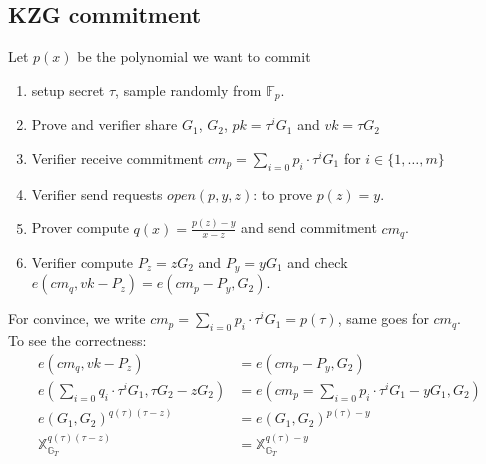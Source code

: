 \documentclass[10pt]{article}
\newcommand{\FField}{\mathbb{F}_p}
\begin{document}
\subsection{KZG commitment}
Let $p(x)$ be the polynomial we want to commit
\begin{enumerate}
    \item setup secret $\tau$, sample randomly from $\FField$.
    \item Prove and verifier share $G_1$, $G_2$, $pk = \tau^iG_1$ and $vk = \tau G_2$
    \item Verifier receive commitment ${cm}_p = \sum_{i=0}p_i \cdot \tau^iG_1$ for
        $i \in \{1, \ldots, m\}$
    \item Verifier send requests $open(p, y, z)$: to prove $p(z) = y$.
    \item Prover compute $q(x) = \frac{p(z) - y}{x-z}$ and send commitment
        ${cm}_q$.
    \item Verifier compute $P_z = zG_2$ and $P_y = yG_1$ and check 
        $e({cm}_q, vk-P_z) = e({cm}_p-P_y, G_2)$.
\end{enumerate}
For convince, we write $cm_{p} = \sum_{i=0}p_i \cdot \tau^iG_1 = p(\tau)$, same
goes for ${cm}_q$.\\
To see the correctness:
\[
\begin{aligned}
    e({cm}_q, vk-P_z) &= e({cm}_p-P_y, G_2)\\
    e(\sum_{i=0}q_i \cdot \tau^iG_1, \tau G_2-z G_2) &= e({cm}_p =
    \sum_{i=0}p_i \cdot \tau^iG_1-yG_1, G_2)\\
    e(G_1, G_2)^{q(\tau)(\tau - z)} &= e(G_1,G_2)^{p(\tau)-y}\\
    \mathbb{X}^{q(\tau)(\tau - z)}_{\mathbb{G}_T} &= \mathbb{X}^{q(\tau) - y}_{\mathbb{G}_T}
\end{aligned}
\]
\end{document}
